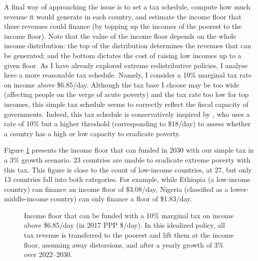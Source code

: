\documentclass[12pt,english]{article}
\begin{document}
A final way of approaching the issue is to set a tax schedule, compute how much revenue it would generate in each country, and estimate the income floor that these revenues could finance (by topping up the incomes of the poorest to the income floor). Note that the value of the income floor depends on the whole income distribution: the top of the distribution determines the revenues that can be generated; and the bottom dictates the cost of raising low incomes up to a given floor. As I have already explored extreme redistributive policies, I analyse here a more reasonable tax schedule. Namely, I consider a 10\% marginal tax rate on income above \$6.85/day. Although the tax base I choose may be too wide (affecting people on the verge of acute poverty) %
and the tax rate too low for top incomes, 
this simple tax schedule seems to correctly reflect the fiscal capacity of governments. Indeed, this tax schedule is conservatively inspired by \cite{ravallion_poorer_2010}, who uses a rate of 10\% but a higher threshold (corresponding to \$18/day) to assess whether a country has a high or low capacity to eradicate poverty. 

Figure \ref{fig:demogrant_7__10} presents the income floor that can funded in 2030 with our simple tax in a 3\% growth scenario. 23 countries are unable to eradicate extreme poverty with this tax. This figure is close to the count of low-income countries, at 27, but only 13 countries fall into both categories.
For example, while Ethiopia (a low-income country) can finance an income floor of \$3.08/day, Nigeria (classified as a lower-middle-income country) can only finance a floor of \$1.83/day. 

\begin{figure}[t!]
  \caption[Income floor of 10\% tax above \$6.85/day in 2030 after 3\% growth.]{Income floor that can be funded with a 10\% marginal tax on income above \$6.85/day (in 2017 PPP \$/day). In this idealized policy, all tax revenue is transferred to the poorest and lift them at the income floor, assuming away distorsions, and after a yearly growth of 3\% over 2022--2030. 
  }\label{fig:demogrant_7__10}
\end{figure}
\end{document}
